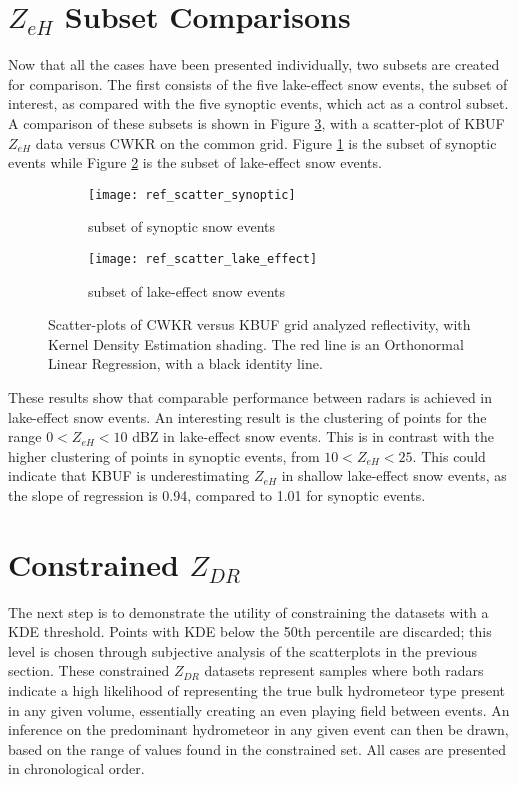 \section{$Z_{eH}$ Subset Comparisons}
Now that all the cases have been presented individually, two subsets are created for comparison. The first consists of the five lake-effect snow events, the
subset of interest, as compared with the five synoptic events, which act as a control subset.
A comparison of these subsets is shown in Figure \ref{fig:ref_scatter}, with a scatter-plot of KBUF $Z_{eH}$ data versus CWKR on the common grid. Figure
\ref{fig:ref_synoptic} is the subset of synoptic events while Figure \ref{fig:ref_lake_effect} is the subset of lake-effect snow events. 
\begin{figure}[H]
\centering
   \begin{subfigure}{0.49\linewidth} \centering
     \texttt{[image: ref\_scatter\_synoptic]}
     \caption{subset of synoptic snow events}\label{fig:ref_synoptic}
   \end{subfigure}
   \begin{subfigure}{0.49\linewidth} \centering
     \texttt{[image: ref\_scatter\_lake\_effect]}
     \caption{subset of lake-effect snow events}\label{fig:ref_lake_effect}
   \end{subfigure}
\caption{Scatter-plots of CWKR versus KBUF grid analyzed reflectivity, with Kernel Density Estimation shading. The red line is an Orthonormal Linear
Regression, with a black identity line.} \label{fig:ref_scatter}
\end{figure}
These results show that
comparable performance between radars is achieved in lake-effect snow events. An interesting result is the clustering of points for the range $0 < Z_{eH} < 10$
dBZ in lake-effect snow events. This is in contrast with the higher clustering of points in synoptic events, from $10 < Z_{eH} < 25$. This could indicate that KBUF is underestimating $Z_{eH}$ in shallow lake-effect snow events, as the slope of regression is 0.94, compared to 1.01 for synoptic events.

\section{Constrained $Z_{DR}$}
The next step is to demonstrate the utility of constraining the datasets with a KDE threshold. Points with KDE below the 50th percentile are discarded; this level is chosen
through subjective analysis of the scatterplots in the previous section. These constrained $Z_{DR}$ datasets represent samples where both radars indicate a
high likelihood of representing the true bulk hydrometeor type present in any given volume, essentially creating an even playing field between events. An
inference on the predominant hydrometeor in any given event can then be drawn, based on the range of values found in the constrained set. All cases are
presented in chronological order.
